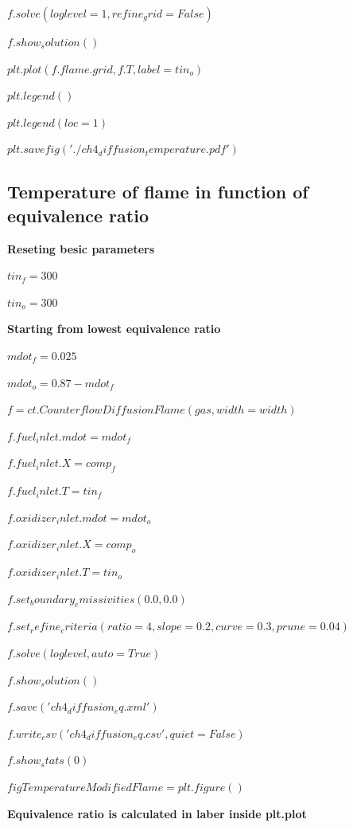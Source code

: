 \documentclass[a4paper]{article}
\begin{document}
\hspace{5,35mm}$    f.solve(loglevel=1, refine_grid=False)$

\hspace{5,35mm}$    f.show_solution()$

\hspace{5,35mm}$    plt.plot(f.flame.grid, f.T, label=tin_o)$

\hspace{5,35mm}$    plt.legend()$

\hspace{5,35mm}$    plt.legend(loc=1)$

$plt.savefig('./ch4_diffusion_temperature.pdf')$

\subsection{Temperature of flame in function of equivalence ratio}

\textbf{Reseting besic parameters}

$tin_f=300$

$tin_o=300$

\textbf{Starting from lowest equivalence ratio}

$mdot_f = 0.025$

$mdot_o = 0.87-mdot_f$

$f = ct.CounterflowDiffusionFlame(gas, width=width)$

$f.fuel_inlet.mdot = mdot_f$

$f.fuel_inlet.X = comp_f$

$f.fuel_inlet.T = tin_f$

$f.oxidizer_inlet.mdot = mdot_o$

$f.oxidizer_inlet.X = comp_o$

$f.oxidizer_inlet.T = tin_o$

$f.set_boundary_emissivities(0.0, 0.0)$

$f.set_refine_criteria(ratio=4, slope=0.2, curve=0.3, prune=0.04)$

$f.solve(loglevel, auto=True)$

$f.show_solution()$

$f.save('ch4_diffusion_eq.xml')$

$f.write_csv('ch4_diffusion_eq.csv', quiet=False)$

$f.show_stats(0)$

$figTemperatureModifiedFlame = plt.figure()$

\textbf{Equivalence ratio is calculated in laber inside plt.plot}
\end{document}
